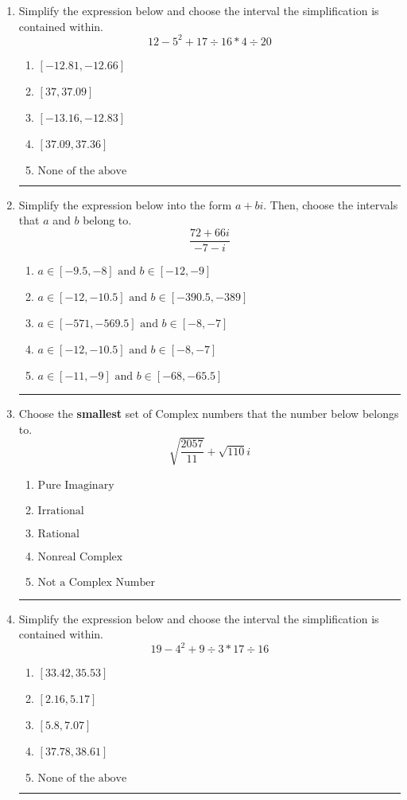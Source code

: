 \documentclass[14pt]{extbook}
\newcommand{\litem}[1]{\item#1\hspace*{-1cm}\rule{\textwidth}{0.4pt}}
\begin{document}
\begin{enumerate}
{\begin{enumerate}[label=\Alph*.]
\end{enumerate} }
\litem{
Simplify the expression below and choose the interval the simplification is contained within.\[ 12 - 5^2 + 17 \div 16 * 4 \div 20 \]\begin{enumerate}[label=\Alph*.]
\item \( [-12.81, -12.66] \)
\item \( [37, 37.09] \)
\item \( [-13.16, -12.83] \)
\item \( [37.09, 37.36] \)
\item \( \text{None of the above} \)

\end{enumerate} }
\litem{
Simplify the expression below into the form $a+bi$. Then, choose the intervals that $a$ and $b$ belong to.\[ \frac{72 + 66 i}{-7 - i} \]\begin{enumerate}[label=\Alph*.]
\item \( a \in [-9.5, -8] \text{ and } b \in [-12, -9] \)
\item \( a \in [-12, -10.5] \text{ and } b \in [-390.5, -389] \)
\item \( a \in [-571, -569.5] \text{ and } b \in [-8, -7] \)
\item \( a \in [-12, -10.5] \text{ and } b \in [-8, -7] \)
\item \( a \in [-11, -9] \text{ and } b \in [-68, -65.5] \)

\end{enumerate} }
\litem{
Choose the \textbf{smallest} set of Complex numbers that the number below belongs to.\[ \sqrt{\frac{2057}{11}}+\sqrt{110} i \]\begin{enumerate}[label=\Alph*.]
\item \( \text{Pure Imaginary} \)
\item \( \text{Irrational} \)
\item \( \text{Rational} \)
\item \( \text{Nonreal Complex} \)
\item \( \text{Not a Complex Number} \)

\end{enumerate} }
\litem{
Simplify the expression below and choose the interval the simplification is contained within.\[ 19 - 4^2 + 9 \div 3 * 17 \div 16 \]\begin{enumerate}[label=\Alph*.]
\item \( [33.42, 35.53] \)
\item \( [2.16, 5.17] \)
\item \( [5.8, 7.07] \)
\item \( [37.78, 38.61] \)
\item \( \text{None of the above} \)


\end{enumerate}}
\end{enumerate}
\end{document}
